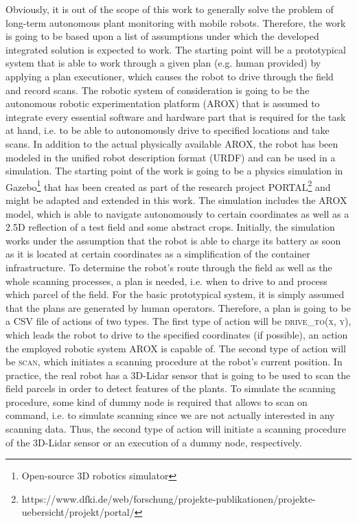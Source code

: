 \documentclass[english, master, expose, utf8]{base/thesis_KBS}
\begin{document}
Obviously, it is out of the scope of this work to generally solve the problem of long-term autonomous plant monitoring with mobile robots.
Therefore, the work is going to be based upon a list of assumptions under which the developed integrated solution is expected to work.
The starting point will be a prototypical system that is able to work through a given plan (e.g. human provided) by applying a plan executioner,
which causes the robot to drive through the field and record scans.
The robotic system of consideration is going to be the autonomous robotic experimentation platform (AROX) \cite{Kisliuk:2021} that is assumed to integrate every
essential software and hardware part that is required for the task at hand, i.e. to be able to autonomously drive to specified locations and take scans.
In addition to the actual physically available AROX, the robot has been modeled in the unified robot description format (URDF) and can be used in a simulation.
The starting point of the work is going to be a physics simulation in Gazebo\footnote{Open-source 3D robotics simulator} that has been created as part of the research project 
PORTAL\footnote{https://www.dfki.de/web/forschung/projekte-publikationen/projekte-uebersicht/projekt/portal/} and might be adapted and extended in this work.
The simulation includes the AROX model, which is able to navigate autonomously to certain coordinates as well as a 2.5D  reflection of a test field and some abstract crops.
Initially, the simulation works under the assumption that the robot is able to charge its battery as soon as it is located at certain coordinates as a simplification
of the container infrastructure.\newline
To determine the robot's route through the field as well as the whole scanning processes, a plan is needed, i.e. when to drive to and process which parcel of the field. 
For the basic prototypical system, it is simply assumed that the plans are generated by human operators. Therefore, a plan is going to be a CSV file of actions of two types.
The first type of action will be \textsc{drive\_to(x, y)}, which leads the robot to drive to the specified coordinates (if possible), an action the employed robotic system 
AROX is capable of. The second type of action will be \textsc{scan}, which initiates a scanning procedure at the robot's current position. 
In practice, the real robot has a 3D-Lidar sensor that is going to be used to scan the field parcels in order to detect features of the plants. To simulate the scanning 
procedure, some kind of dummy node is required that allows to scan on command, i.e. to simulate scanning since we are not actually interested in any scanning data.
Thus, the second type of action will initiate a scanning procedure of the 3D-Lidar sensor or an execution of a dummy node, respectively.
\end{document}
